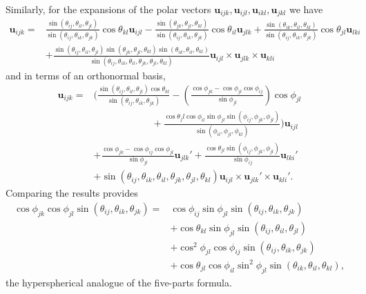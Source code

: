 \documentclass[fleqn,11pt,twoside]{article}
\theoremstyle{definition}
\begin{document}
Similarly, for the expansions of the polar vectors $\mathbf{u}_{ijk},\mathbf{u}_{ijl},\mathbf{u}_{ikl},\mathbf{u}_{jkl}$ we have
\begin{equation}
\begin{split}
\mathbf{u}_{ijk}=&\frac{\sin(\theta_{ij},\theta_{il},\theta_{jl})}{\sin(\theta_{ij},\theta_{ik},\theta_{jk})}\cos\theta_{kl}\mathbf{u}_{ijl}
-\frac{\sin(\theta_{jk},\theta_{jl},\theta_{kl})}{\sin(\theta_{ij},\theta_{ik},\theta_{jk})}\cos\theta_{il}\mathbf{u}_{jlk}
+\frac{\sin(\theta_{ik},\theta_{il},\theta_{kl})}{\sin(\theta_{ij},\theta_{ik},\theta_{jk})}\cos\theta_{jl}\mathbf{u}_{lki}\\
&+\frac{\sin(\theta_{ij},\theta_{il},\theta_{jl})\sin(\theta_{jk},\theta_{jl},\theta_{kl})\sin(\theta_{ik},\theta_{il},\theta_{kl})}{\sin(\theta_{ij},\theta_{ik},\theta_{il},\theta_{jk},\theta_{jl},\theta_{kl})}\mathbf{u}_{ijl}\times\mathbf{u}_{jlk}\times\mathbf{u}_{kli}
\end{split} 
\end{equation}
and in terms of an orthonormal basis,
\begin{equation}
\begin{split}
\mathbf{u}_{ijk}=&\Bigg(\frac{\sin(\theta_{ij},\theta_{il},\theta_{jl})\cos\theta_{kl}}{\sin(\theta_{ij},\theta_{ik},\theta_{jk})}-\left(\frac{\cos\phi_{jk}-\cos\phi_{jl}\cos\phi_{ij}}{\sin\phi_{jl}}\right)\cos\phi_{jl}\\
&\hspace{1in}+\frac{\cos\theta_jl\cos\phi_{il}\sin\phi_{jl}\sin(\phi_{ij},\phi_{jk},\phi_{jl})}{\sin(\phi_{il},\phi_{jl},\phi_{kl})}\Bigg)\mathbf{u}_{ijl}\\
&+\frac{\cos\phi_{jk}-\cos\phi_{ij}\cos\phi_{jl}}{\sin\phi_{jl}}\mathbf{u}_{jlk}'+\frac{\cos\theta_{jl}\sin(\phi_{ij},\phi_{jk},\phi_{jl})}{\sin\phi_{ij}}\mathbf{u}_{lki}'\\
&+\sin(\theta_{ij},\theta_{ik},\theta_{il},\theta_{jk},\theta_{jl},\theta_{kl})\mathbf{u}_{ijl}\times\mathbf{u}_{jlk}'\times\mathbf{u}_{kli}'.
\end{split}
\end{equation}
Comparing the results provides
\begin{equation}
\begin{split}
\cos\phi_{jk}\cos\phi_{jl}\sin(\theta_{ij},\theta_{ik},\theta_{jk})=&\cos\phi_{ij}\sin\phi_{jl}\sin(\theta_{ij},\theta_{ik},\theta_{jk})\\
&+\cos\theta_{kl}\sin\phi_{jl}\sin(\theta_{ij},\theta_{il},\theta_{jl})\\
&+\cos^2\phi_{jl}\cos\phi_{ij}\sin(\theta_{ij},\theta_{ik},\theta_{jk})\\
&+\cos\theta_{jl}\cos\phi_{il}\sin^2\phi_{jl}\sin(\theta_{ik},\theta_{il},\theta_{kl}),
\end{split}
\end{equation}
the hyperspherical analogue of the five-parts formula.
\end{document}
